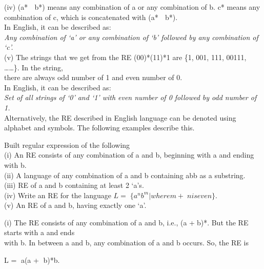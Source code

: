 \begin{solution}
\noindent\!\!\!\!\!\!\!\!\!\!(iv)	(a*  b*) means any combination of a or any combination of b. c* means any combination of c, which is concatenated with (a*  b*).\\
\indent In English, it can be described as:\\

 \indent\emph{Any combination of ‘a’ or any combination of ‘b’ followed by any combination of ‘c’.}\\

\noindent\!\!\!\!\!\!\!\!\!\!(v)	The strings that we get from the RE (00)*(11)*1 are \{1, 001, 111, 00111, ……\}. In the string,\\ there are always odd number of 1 and even number of 0.\\
\indent In English, it can be described as:\\

\indent\indent \emph{Set of all strings of ‘0’ and ‘1’ with even number of 0 followed by odd number of 1.}\\

\noindent Alternatively, the RE described in English language can be denoted using alphabet and symbols. The following examples describe this.\\
\end{solution}
\!\!\!\!\!\!\!\!\!\!\!\!\!\!\!\begin{example}
\textnormal{\small Built regular expression of the following\\
(i)	An RE consists of any combination of a and b, beginning with a and ending with b.\\
(ii)	A language of any combination of a and b containing abb as a substring.\\
(iii)	RE of a and b containing at least 2 ‘a’s.\\
(iv)	Write an RE for the language $L =\{a^nb^m | where m+n is even\}$.\\
(v)	An RE of a and b, having exactly one ‘a’.}
\end{example}

\!\!\!\!\!\!\!\!\!\!\!\!\!\!\!\!\!\!\!\!\begin{solution}

\noindent\!\!\!\!\!\!\!\!\!\!(i)	The RE consists of any combination of a and b, i.e., (a +b)*. But the RE starts with a and ends\\ with b. In between a and b, any combination of a and b occurs. So, the RE is\\
\begin{center}
L = a(a + b)*b.
\end{center}
\end{solution}
\newpage
\begin{quote}
\footnotesize
\end{quote}

